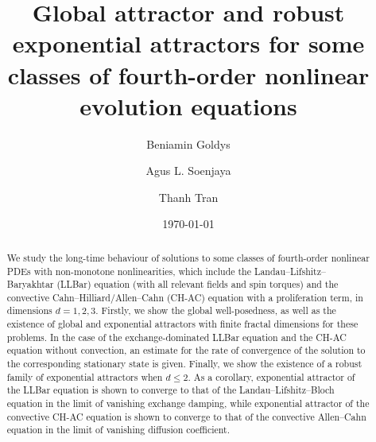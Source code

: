 \documentclass[11pt, reqno]{amsart}
\theoremstyle{definition}
\numberwithin{equation}{section}
\begin{document}
\setcounter{page}{1}

\title[Global attractor and robust exponential attractors for fourth-order PDEs]{Global attractor and robust exponential attractors for some classes of fourth-order nonlinear evolution equations}

\author[Beniamin Goldys]{Beniamin Goldys}
\address{School of Mathematics and Statistics, The University of Sydney, Sydney 2006, Australia}
\email{\textcolor[rgb]{0.00,0.00,0.84}{beniamin.goldys@sydney.edu.au}}

\author[Agus L. Soenjaya]{Agus L. Soenjaya}
\address{School of Mathematics and Statistics, The University of New South Wales, Sydney 2052, Australia}
\email{\textcolor[rgb]{0.00,0.00,0.84}{a.soenjaya@unsw.edu.au}}

\author[Thanh Tran]{Thanh Tran}
\address{School of Mathematics and Statistics, The University of New South Wales, Sydney 2052, Australia}
\email{\textcolor[rgb]{0.00,0.00,0.84}{thanh.tran@unsw.edu.au}}

\date{\today}
\keywords{}
\subjclass{}


\begin{abstract}
We study the long-time behaviour of solutions to some classes of fourth-order nonlinear PDEs with non-monotone nonlinearities, which include the Landau--Lifshitz--Baryakhtar (LLBar) equation (with all relevant fields and spin torques) and the convective Cahn--Hilliard/Allen--Cahn (CH-AC) equation with a proliferation term, in dimensions $d=1,2,3$. Firstly, we show the global well-posedness, as well as the existence of global and exponential attractors with finite fractal dimensions for these problems. In the case of the exchange-dominated LLBar equation and the CH-AC equation without convection, an estimate for the rate of convergence of the solution to the corresponding stationary state is given. Finally, we show the existence of a robust family of exponential attractors when $d\leq 2$. As a corollary, exponential attractor of the LLBar equation is shown to converge to that of the Landau--Lifshitz--Bloch equation in the limit of vanishing exchange damping, while exponential attractor of the convective CH-AC equation is shown to converge to that of the convective Allen--Cahn equation in the limit of vanishing diffusion coefficient.
\end{abstract}
\maketitle
\tableofcontents
\end{document}
